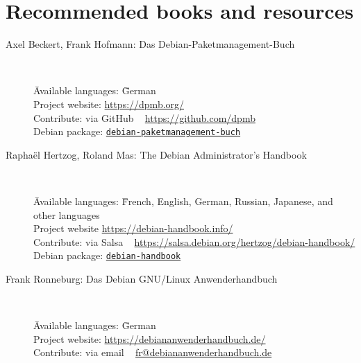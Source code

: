 \documentclass[10pt]{article}
\begin{document}
\newpage

\cheatsheet

\section{Recommended books and resources}

\begin{description}
    \item[Axel Beckert, Frank Hofmann: Das Debian-Paketmanagement-Buch] ~ \\
        \begin{tabbing}
            \= Available languages: \= \= German \\
            \> Project website: \> \> \href{https://dpmb.org/}{https://dpmb.org/} \\
            \> Contribute: \> \> via GitHub ~  \href{https://github.com/dpmb}{https://github.com/dpmb} \\
            \> Debian package: \> \> \href{https://packages.debian.org/stable/debian-paketmanagement-buch}{\texttt{debian-paketmanagement-buch}} \\ 
        \end{tabbing}

    \item[Raphaël Hertzog, Roland Mas: The Debian Administrator's Handbook] ~ \\ 
        \begin{tabbing}
            \= Available languages: \= \= French, English, German, Russian, Japanese, and other languages \\
            \> Project website \> \> \href{https://debian-handbook.info/}{https://debian-handbook.info/} \\
            \> Contribute: \> \> via Salsa ~ \href{https://salsa.debian.org/hertzog/debian-handbook/}{https://salsa.debian.org/hertzog/debian-handbook/} \\
            \> Debian package: \> \> \href{https://packages.debian.org/stable/debian-handbook}{\texttt{debian-handbook}} \\
        \end{tabbing}

    \item[Frank Ronneburg: Das Debian GNU/Linux Anwenderhandbuch] ~ \\
        \begin{tabbing}
            \= Available languages: \= \= German \\
            \> Project website: \> \> \href{https://debiananwenderhandbuch.de/}{https://debiananwenderhandbuch.de/} \\
            \> Contribute: \> \> via email ~  
            \href{mailto:fr@debiananwenderhandbuch.de}{fr@debiananwenderhandbuch.de} \\
            

\end{tabbing}
\end{description}
\end{document}
